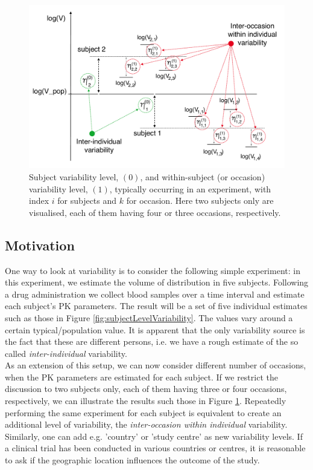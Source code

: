 \begin{figure}[htb!]
\centering
  \includegraphics[width=120mm]{pics/Subject-occasion-level.pdf}
 \caption{Subject variability level, $(0)$, and within-subject (or occasion) variability level, $(1)$, typically occurring in an experiment, with index $i$ for subjects and $k$ for occasion. Here two subjects only are visualised, each of them having four or three occasions, respectively.}
 \label{fig:subjectOccasionLevelVariability}
\end{figure}

\subsection{Motivation}
One way to look at variability is to consider the following simple experiment: in this 
experiment, we estimate the volume of distribution in five subjects. Following a drug 
administration we collect blood samples over a time interval and estimate each 
subject's PK parameters. The result will be a set of five individual estimates such 
as those in Figure \ref{fig:subjectLevelVariability}. The values vary around a certain 
typical/population value. It is apparent that the only variability source is the fact that 
these are different persons, i.e. we have a rough estimate of the so called 
\textit{inter-individual} variability.\\
As an extension of this setup, we can now consider different number of occasions, 
when the PK parameters are estimated for each subject. If we restrict the discussion 
to two subjects only, each of them having three or four occasions, respectively, we 
can illustrate the results such those in Figure \ref{fig:subjectOccasionLevelVariability}. 
Repeatedly performing the same experiment for each subject is equivalent to create 
an additional level of variability, the \textit{inter-occasion within individual} variability.\\ 
Similarly, one can add e.g. 'country' or 'study centre' as new variability levels. 
If a clinical trial has been conducted in various countries or centres, it is reasonable 
to ask if the geographic location influences the outcome of the study. 

